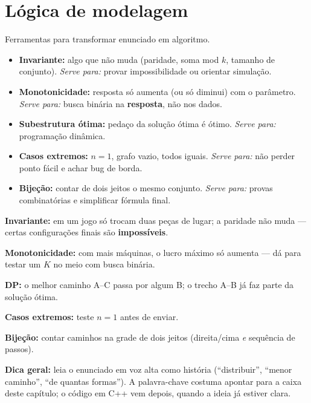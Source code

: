 \section{Lógica de modelagem}

Ferramentas para transformar enunciado em algoritmo.

\begin{itemize}
  \item \textbf{Invariante:} algo que não muda (paridade, soma mod $k$, tamanho de conjunto). \emph{Serve para:} provar impossibilidade ou orientar simulação.
  \item \textbf{Monotonicidade:} resposta só aumenta (ou só diminui) com o parâmetro. \emph{Serve para:} busca binária na \textbf{resposta}, não nos dados.
  \item \textbf{Subestrutura ótima:} pedaço da solução ótima é ótimo. \emph{Serve para:} programação dinâmica.
  \item \textbf{Casos extremos:} $n=1$, grafo vazio, todos iguais. \emph{Serve para:} não perder ponto fácil e achar bug de borda.
  \item \textbf{Bijeção:} contar de dois jeitos o mesmo conjunto. \emph{Serve para:} provas combinatórias e simplificar fórmula final.
\end{itemize}

\begin{exemplodiabox}
\textbf{Invariante:} em um jogo só trocam duas peças de lugar; a paridade não muda --- certas configurações finais são \textbf{impossíveis}.

\textbf{Monotonicidade:} com mais máquinas, o lucro máximo só aumenta --- dá para testar um $K$ no meio com busca binária.

\textbf{DP:} o melhor caminho A--C passa por algum B; o trecho A--B já faz parte da solução ótima.

\textbf{Casos extremos:} teste $n=1$ antes de enviar.

\textbf{Bijeção:} contar caminhos na grade de dois jeitos (direita/cima \emph{e} sequência de passos).
\end{exemplodiabox}


\medskip
\noindent\textbf{Dica geral:} leia o enunciado em voz alta como história (``distribuir'', ``menor caminho'', ``de quantas formas''). A palavra-chave costuma apontar para a caixa deste capítulo; o código em C++ vem depois, quando a ideia já estiver clara.
